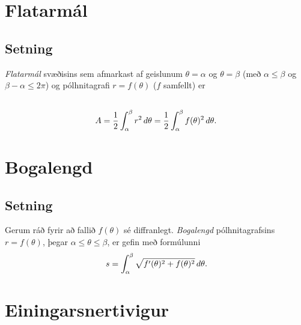 \documentclass[a4paper,10pt,icelandic]{sphinxmanual}
\begin{document}

\section{Flatarmál}
\label{Kafli1:index-12}\label{Kafli1:flatarmal}

\subsection{Setning}
\label{Kafli1:id12}
\textit{Flatarmál} svæðisins sem afmarkast af geislunum \(\theta=\alpha\) og
\(\theta=\beta\) (með \(\alpha\leq \beta\) og
\(\beta-\alpha\leq 2\pi\)) og pólhnitagrafi \(r=f(\theta)\)
(\(f\) samfellt) er
\begin{gather}
\begin{split}\displaystyle\end{split}\notag\\\begin{split}A=\frac{1}{2}\int_\alpha^\beta r^2\,d\theta
=\frac{1}{2}\int_\alpha^\beta f(\theta)^2\,d\theta.\end{split}\notag
\end{gather}

\section{Bogalengd}
\label{Kafli1:index-13}\label{Kafli1:bogalengd}

\subsection{Setning}
\label{Kafli1:id13}
Gerum ráð fyrir að fallið \(f(\theta)\) sé diffranlegt. \textit{Bogalengd}
pólhnitagrafsins \(r=f(\theta)\), þegar
\(\alpha\leq\theta\leq\beta\), er gefin með formúlunni
\begin{gather}
\begin{split}\displaystyle s=\int_\alpha^\beta \sqrt{f'(\theta)^2+f(\theta)^2}\,d\theta.\end{split}\notag
\end{gather}

\section{Einingarsnertivigur}
\label{Kafli1:einingarsnertivigur}
\end{document}
